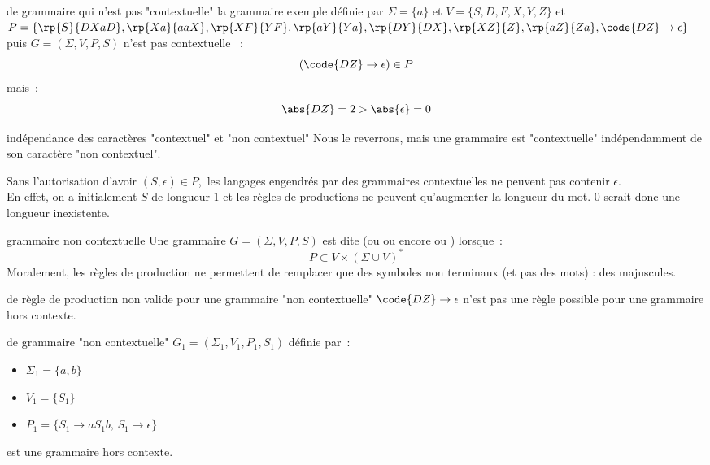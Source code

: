 \begin{adjustwidth}{-3cm}{-3cm}
\begin{exemple}{}{de grammaire qui n'est pas "contextuelle"}
    la grammaire exemple définie par $\Sigma = \{a\}$ et $V = \{S,D,F,X,Y,Z\}$ et $P = \{\rp{S}{DXaD},\rp{Xa}{aaX},\rp{XF}{YF},\rp{aY}{Ya},\rp{DY}{DX},\rp{XZ}{Z},\rp{aZ}{Za},\code{DZ}\to \epsilon\}$ puis $G = (\Sigma, V, P, S)$ n'est pas contextuelle ~:
    $$(\code{DZ}\rightarrow \epsilon) \in P$$
    mais~:
    $$\abs{DZ} = 2 > \abs{\epsilon} = 0$$
\end{exemple}

\begin{remarque}{}{indépendance des caractères "contextuel" et "non contextuel"}
    Nous le reverrons, mais une grammaire est "contextuelle" indépendamment de son caractère "non contextuel".
\end{remarque}

\begin{remarque}{}{}
    Sans l'autorisation d'avoir $(S,\epsilon) \in P$,\, les langages engendrés par des grammaires contextuelles ne peuvent pas contenir $\epsilon$.\\
    En effet, on a initialement $S$ de longueur 1 et les règles de productions ne peuvent qu'augmenter la longueur du mot. 0 serait donc une longueur inexistente.
\end{remarque}

\begin{definition}{}{grammaire non contextuelle}
    Une grammaire $G = (\Sigma, V, P, S)$ est dite  (ou  ou encore  ou ) lorsque~:
    $$P \subset V \times (\Sigma \cup V)^*$$
    Moralement, les règles de production ne permettent de remplacer que des symboles non terminaux (et pas des mots) : des majuscules.
\end{definition}

\begin{exemple}{}{de règle de production non valide pour une grammaire "non contextuelle"}
    $\code{DZ}\rightarrow \epsilon$ n'est pas une règle possible pour une grammaire hors contexte.
\end{exemple}

\begin{exemple}{}{de grammaire "non contextuelle"}
    $G_1 = (\Sigma_1, V_1, P_1, S_1)$ définie par~:
    \begin{itemize}
        \item $\Sigma_1 = \{a,b\}$
        \item $V_1 = \{S_1\}$
        \item $P_1 = \{S_1 \rightarrow a S_1 b,\,S_1\rightarrow \epsilon\}$
    \end{itemize}
    est une grammaire hors contexte.
\end{exemple}


\end{adjustwidth}
